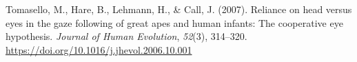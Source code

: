 \documentclass[
  man,mask,floatsintext]{apa7}
\newlength{\cslhangindent}
\newlength{\cslentryspacingunit} %
\newenvironment{CSLReferences}[2] %
 {%
  \setlength{\parindent}{0pt}
  \ifodd #1
  \let\oldpar\par
  \def\par{\hangindent=\cslhangindent\oldpar}
  \fi
  \setlength{\parskip}{#2\cslentryspacingunit}
 }%
 {}
\begin{document}
\begin{CSLReferences}{1}{0}
\leavevmode{}%
Tomasello, M., Hare, B., Lehmann, H., \& Call, J. (2007). Reliance on head versus eyes in the gaze following of great apes and human infants: The cooperative eye hypothesis. \emph{Journal of Human Evolution}, \emph{52}(3), 314--320. \url{https://doi.org/10.1016/j.jhevol.2006.10.001}

\end{CSLReferences}

\endgroup
\end{document}

